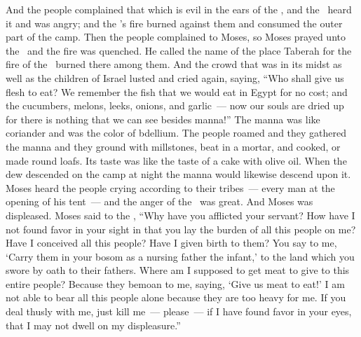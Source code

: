 
\begin{inparaenum}
   And the people complained that which is evil in the ears of the \lord, and the \lord\ heard it and was angry; and the \lord's fire burned against them and consumed the outer part of the camp.%
   Then the people complained to Moses, so Moses prayed unto the \lord\ and the fire was quenched.%
   He called the name of the place Taberah for the fire of the \lord\ burned there among them.%
   And the crowd that was in its midst as well as the children of Israel lusted and cried again, saying, ``Who shall give us flesh to eat?%
   We remember the fish that we would eat in Egypt for no cost; and the cucumbers, melons, leeks, onions, and garlic~---%
   now our souls are dried up for there is nothing that we can see besides manna!''%
   The manna was like coriander and was the color of bdellium.%
   The people roamed and they gathered the manna and they ground with millstones, beat in a mortar, and cooked, or made round loafs. Its taste was like the taste of a cake with olive oil.%
   When the dew descended on the camp at night the manna would likewise descend upon it.%
   Moses heard the people crying according to their tribes~--- every man at the opening of his tent~--- and the anger of the \lord\ was great. And Moses was displeased.%
   Moses said to the \lord, ``Why have you afflicted your servant? How have I not found favor in your sight in that you lay the burden of all this people on me?%
   Have I conceived all this people? Have I given birth to them? You say to me, `Carry them in your bosom as a nursing father the infant,' to the land which you swore by oath to their fathers.%
   Where am I supposed to get meat to give to this entire people? Because they bemoan to me, saying, `Give us meat to eat!'%
   I am not able to bear all this people alone because they are too heavy for me.%
   If you deal thusly with me, just kill me~--- please~--- if I have found favor in your eyes, that I may not dwell on my displeasure.''%
  

\end{inparaenum}
